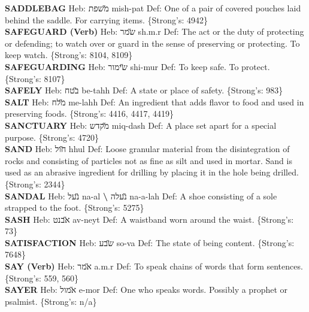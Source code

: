 {\textbf{SADDLEBAG} Heb: {\large\H משפת} mish-pat Def: One of a pair of covered pouches laid behind the saddle. For carrying items. \{Strong's: 4942\}\hfill{}\\

\textbf{SAFEGUARD (Verb)} Heb: {\large\H שמר} sh.m.r Def: The act or the duty of protecting or defending; to watch over or guard in the sense of preserving or protecting. To keep watch. \{Strong's: 8104, 8109\}\hfill{}\\

\textbf{SAFEGUARDING} Heb: {\large\H שימור} shi-mur Def: To keep safe. To protect. \{Strong's: 8107\}\hfill{}\\

\textbf{SAFELY} Heb: {\large\H בטח} be-tahh Def: A state or place of safety. \{Strong's: 983\}\hfill{}\\

\textbf{SALT} Heb: {\large\H מלח} me-lahh Def: An ingredient that adds flavor to food and used in preserving foods. \{Strong's: 4416, 4417, 4419\}\hfill{}\\

\textbf{SANCTUARY} Heb: {\large\H מקדש} miq-dash Def: A place set apart for a special purpose. \{Strong's: 4720\}\hfill{}\\

\textbf{SAND} Heb: {\large\H חול} hhul Def: Loose granular material from the disintegration of rocks and consisting of particles not as fine as silt and used in mortar. Sand is used as an abrasive ingredient for drilling by placing it in the hole being drilled. \{Strong's: 2344\}\hfill{}\\

\textbf{SANDAL} Heb: {\large\H נעל} na-al \textbf{\textbackslash{}} {\large\H נעלה} na-a-lah Def: A shoe consisting of a sole strapped to the foot. \{Strong's: 5275\}\hfill{}\\

\textbf{SASH} Heb: {\large\H אבנט} av-neyt Def: A waistband worn around the waist. \{Strong's: 73\}\hfill{}\\

\textbf{SATISFACTION} Heb: {\large\H שבע} so-va Def: The state of being content. \{Strong's: 7648\}\hfill{}\\

\textbf{SAY (Verb)} Heb: {\large\H אמר} a.m.r Def: To speak chains of words that form sentences. \{Strong's: 559, 560\}\hfill{}\\

\textbf{SAYER} Heb: {\large\H אמול} e-mor Def: One who speaks words. Possibly a prophet or psalmist. \{Strong's: n/a\}\hfill{}\\

}
